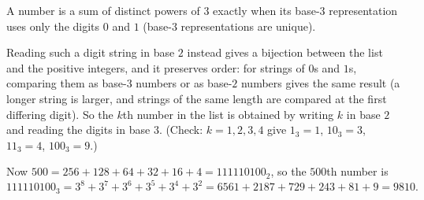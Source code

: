 A number is a sum of distinct powers of $3$ exactly when its base-$3$ representation uses only the digits $0$ and $1$ (base-$3$ representations are unique).

Reading such a digit string in base $2$ instead gives a bijection between the list and the positive integers, and it preserves order: for strings of $0$s and $1$s, comparing them as base-$3$ numbers or as base-$2$ numbers gives the same result (a longer string is larger, and strings of the same length are compared at the first differing digit). So the $k$th number in the list is obtained by writing $k$ in base $2$ and reading the digits in base $3$. (Check: $k=1,2,3,4$ give $1_3=1$, $10_3=3$, $11_3=4$, $100_3=9$.)

Now $500=256+128+64+32+16+4=111110100_2$, so the $500$th number is
\[111110100_3=3^8+3^7+3^6+3^5+3^4+3^2=6561+2187+729+243+81+9=\boxed{9810}.\]
